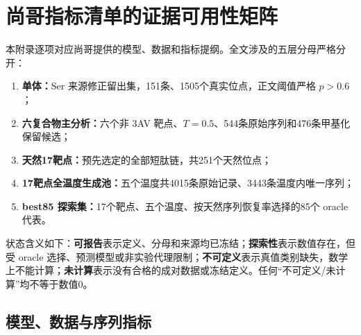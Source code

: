 \section{尚哥指标清单的证据可用性矩阵}
\label{app:metric-matrix}

本附录逐项对应尚哥提供的模型、数据和指标提纲。全文涉及的五层分母严格分开：
\begin{enumerate}
  \item \textbf{单体：}Ser 来源修正留出集，151条、1505个真实位点，正文阈值严格 $p>0.6$；
  \item \textbf{六复合物主分析：}六个非 3AV 靶点、$T=0.5$、544条原始序列和476条甲基化保留候选；
  \item \textbf{天然17靶点：}预先选定的全部短肽链，共251个天然位点；
  \item \textbf{17靶点全温度生成池：}五个温度共4015条原始记录、3443条温度内唯一序列；
  \item \textbf{best85 探索集：}17个靶点、五个温度、按天然序列恢复率选择的85个 oracle 代表。
\end{enumerate}

状态含义如下：\textbf{可报告}表示定义、分母和来源均已冻结；\textbf{探索性}表示数值存在，但受 oracle 选择、预测模型或非实验代理限制；\textbf{不可定义}表示真值类别缺失，数学上不能计算；\textbf{未计算}表示没有合格的成对数据或冻结定义。任何“不可定义/未计算”均不等于数值0。

\subsection{模型、数据与序列指标}

